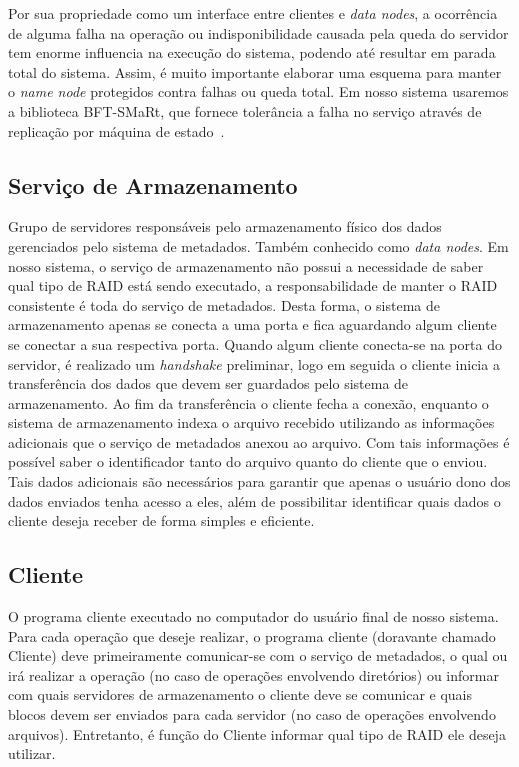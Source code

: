 Por sua propriedade como um interface entre clientes e \textit{data nodes}, a ocorrência de alguma falha na operação ou indisponibilidade causada pela queda do servidor tem  enorme influencia na execução do sistema, podendo até resultar em parada total do sistema. Assim, é muito importante elaborar uma esquema para manter o \textit{name node} protegidos contra falhas ou queda total. Em nosso sistema usaremos a biblioteca BFT-SMaRt, que fornece tolerância a falha no serviço através de replicação por máquina de estado~\citep{bessani3}. \\

\subsection{Serviço de Armazenamento}
Grupo de servidores responsáveis pelo armazenamento físico dos dados gerenciados pelo sistema de metadados. Também conhecido como \textit{data nodes}.
Em nosso sistema, o serviço de armazenamento não possui a necessidade de saber qual tipo de RAID está sendo executado, a responsabilidade de manter o RAID consistente é toda do serviço de metadados. Desta forma, o sistema de armazenamento apenas se conecta a uma porta e fica aguardando algum cliente se conectar a sua respectiva porta. Quando algum cliente conecta-se na porta do servidor, é realizado um \textit{handshake} preliminar, logo em seguida o cliente inicia a transferência dos dados que devem ser guardados pelo sistema de armazenamento. Ao fim da transferência o cliente fecha a conexão, enquanto o sistema de armazenamento indexa o arquivo recebido utilizando as informações adicionais que o serviço de metadados anexou ao arquivo. Com tais informações é possível saber o identificador tanto do arquivo quanto do cliente que o enviou. Tais dados adicionais são necessários para garantir que apenas o usuário dono dos dados enviados tenha acesso a eles, além de possibilitar identificar quais dados o cliente deseja receber de forma simples e eficiente.  
\\

\subsection{Cliente}
O programa cliente executado no computador do usuário final de nosso sistema. 
Para cada operação que deseje realizar, o programa cliente (doravante chamado Cliente) deve primeiramente comunicar-se com o serviço de metadados, o qual ou irá realizar a operação (no caso de operações envolvendo diretórios) ou informar com quais servidores de armazenamento o cliente deve se comunicar e quais blocos devem ser enviados para cada servidor (no caso de operações envolvendo arquivos). Entretanto, é função do Cliente informar qual tipo de RAID ele deseja utilizar.
\\

